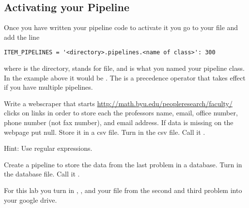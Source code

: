 \subsection*{Activating your Pipeline}
Once you have written your pipeline code to activate it you go to your  file and add the line
\begin{lstlisting}
ITEM_PIPELINES = '<directory>.pipelines.<name of class>': 300
\end{lstlisting}
where  is the directory,  stands for  file, and  is what you named your pipeline class. In the example above it would be . The  is a precedence operator that takes effect if you have multiple pipelines.

\begin{problem}
Write a webscraper that starts \url{http://math.byu.edu/peopleresearch/faculty/} clicks on links  in order to store each the professors name, email, office number, phone number (not fax number), and email address. If data is missing on the webpage put null. Store it in a csv file. Turn in the csv file. Call it .

Hint: Use regular expressions.
\end{problem}

\begin{problem}
Create a pipeline to store the data from the last problem in a database. Turn in the database file. Call it .
\end{problem}

For this lab you turn in , ,  and your  file from the second and third problem into your google drive.
